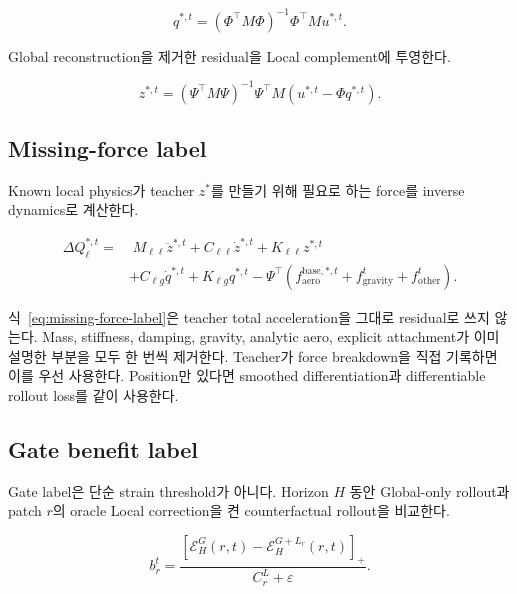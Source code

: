 \documentclass[11pt,a4paper]{article}
\newcommand{\eps}{\varepsilon}
\begin{document}
\begin{equation}
  q^{*,t}
  =
  (\Phi^\top M\Phi)^{-1}\Phi^\top M u^{*,t}.
\end{equation}

Global reconstruction을 제거한 residual을 Local complement에 투영한다.

\begin{equation}
  z^{*,t}
  =
  (\Psi^\top M\Psi)^{-1}
  \Psi^\top M
  (u^{*,t}-\Phi q^{*,t}).
\end{equation}

\subsection{Missing-force label}

Known local physics가 teacher \(z^*\)를 만들기 위해 필요로 하는 force를 inverse dynamics로 계산한다.

\begin{equation}
\begin{aligned}
  \Delta Q_{\ell}^{*,t}
  =&\;
  M_{\ell\ell}\ddot z^{*,t}
  +C_{\ell\ell}\dot z^{*,t}
  +K_{\ell\ell}z^{*,t}\\
  &+C_{\ell g}\dot q^{*,t}
  +K_{\ell g}q^{*,t}
  -\Psi^\top
  \left(
    f_{\mathrm{aero}}^{\mathrm{base},*,t}
    +f_{\mathrm{gravity}}^t
    +f_{\mathrm{other}}^t
  \right).
  \label{eq:missing-force-label}
\end{aligned}
\end{equation}

식~\eqref{eq:missing-force-label}은 teacher total acceleration을 그대로 residual로 쓰지 않는다.
Mass, stiffness, damping, gravity, analytic aero, explicit attachment가 이미 설명한 부분을 모두 한 번씩 제거한다.
Teacher가 force breakdown을 직접 기록하면 이를 우선 사용한다.
Position만 있다면 smoothed differentiation과 differentiable rollout loss를 같이 사용한다.

\subsection{Gate benefit label}

Gate label은 단순 strain threshold가 아니다.
Horizon \(H\) 동안 Global-only rollout과
patch \(r\)의 oracle Local correction을 켠 counterfactual rollout을 비교한다.

\begin{equation}
  b_r^t
  =
  \frac{
    [\mathcal E_H^{G}(r,t)
    -\mathcal E_H^{G+L_r}(r,t)]_+
  }{
    C_r^{L}+\eps
  }.
  \label{eq:benefit-label}
\end{equation}
\end{document}
